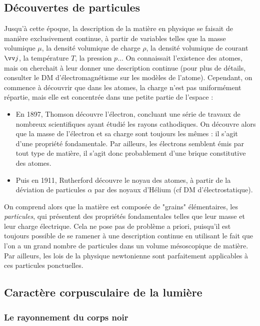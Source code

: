 \documentclass[11pt,fleqn]{book} %
\begin{document}
\subsection{Découvertes de particules}

Jusqu'à cette époque, la description de la matière en physique se faisait de manière exclusivement continue, à partir de variables telles que la masse volumique $\mu$, la densité volumique de charge $\rho$, la densité volumique de courant $\vv j$, la température $T$, la pression $p$... On connaissait l'existence des atomes, mais on cherchait à leur donner une description continue (pour plus de détails, consulter le DM d'électromagnétisme sur les modèles de l'atome). Cependant, on commence à découvrir que dans les atomes, la charge n'est pas uniformément répartie, mais elle est concentrée dans une petite partie de l'espace :
\begin{itemize}
	\item En 1897, Thomson découvre l'électron, concluant une série de travaux de nombreux scientifiques ayant étudié les rayons cathodiques. On découvre alors que la masse de l'électron et sa charge sont toujours les mêmes : il s'agit d'une propriété fondamentale. Par ailleurs, les électrons semblent émis par tout type de matière, il s'agit donc probablement d'une brique constitutive des atomes.
	\item Puis en 1911, Rutherford découvre le noyau des atomes, à partir de la déviation de particules $\alpha$ par des noyaux d'Hélium (cf DM d'électrostatique).
\end{itemize}
On comprend alors que la matière est composée de "grains" élémentaires, les \textit{particules}, qui présentent des propriétés fondamentales telles que leur masse et leur charge électrique. Cela ne pose pas de problème a priori, puisqu'il est toujours possible de se ramener à une description continue en utilisant le fait que l'on a un grand nombre de particules dans un volume mésoscopique de matière. Par ailleurs, les lois de la physique newtonienne sont parfaitement applicables à ces particules ponctuelles.

\subsection{Caractère corpusculaire de la lumière}

\subsubsection{Le rayonnement du corps noir}
\end{document}
